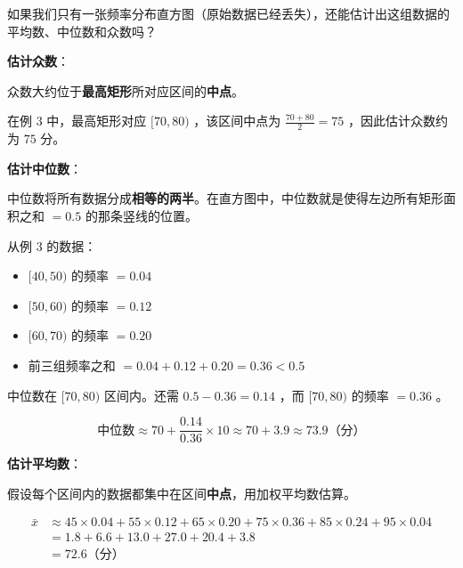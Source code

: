 \begin{explore}


如果我们只有一张频率分布直方图（原始数据已经丢失），还能估计出这组数据的平均数、中位数和众数吗？

\end{explore}

\begin{understand}


\textbf{估计众数}：

众数大约位于\textbf{最高矩形}所对应区间的\textbf{中点}。

在例 3 中，最高矩形对应 $[70, 80)$ ，该区间中点为 $\frac{70 + 80}{2} = 75$ ，因此估计众数约为 $75$ 分。

\textbf{估计中位数}：

中位数将所有数据分成\textbf{相等的两半}。在直方图中，中位数就是使得左边所有矩形面积之和 $= 0.5$ 的那条竖线的位置。

从例 3 的数据：
\begin{itemize}
  \item $[40, 50)$ 的频率 $= 0.04$
  \item $[50, 60)$ 的频率 $= 0.12$
  \item $[60, 70)$ 的频率 $= 0.20$
  \item 前三组频率之和 $= 0.04 + 0.12 + 0.20 = 0.36 < 0.5$
\end{itemize}


中位数在 $[70, 80)$ 区间内。还需 $0.5 - 0.36 = 0.14$ ，而 $[70, 80)$ 的频率 $= 0.36$ 。

\[
\text{中位数} \approx 70 + \frac{0.14}{0.36} \times 10 \approx 70 + 3.9 \approx 73.9 \text{（分）}
\]


\textbf{估计平均数}：

假设每个区间内的数据都集中在区间\textbf{中点}，用加权平均数估算。

\[
\begin{aligned}
\bar{x} &\approx 45 \times 0.04 + 55 \times 0.12 + 65 \times 0.20 + 75 \times 0.36 + 85 \times 0.24 + 95 \times 0.04 \\
&= 1.8 + 6.6 + 13.0 + 27.0 + 20.4 + 3.8 \\
&= 72.6 \text{（分）}
\end{aligned}
\]


\end{understand}

